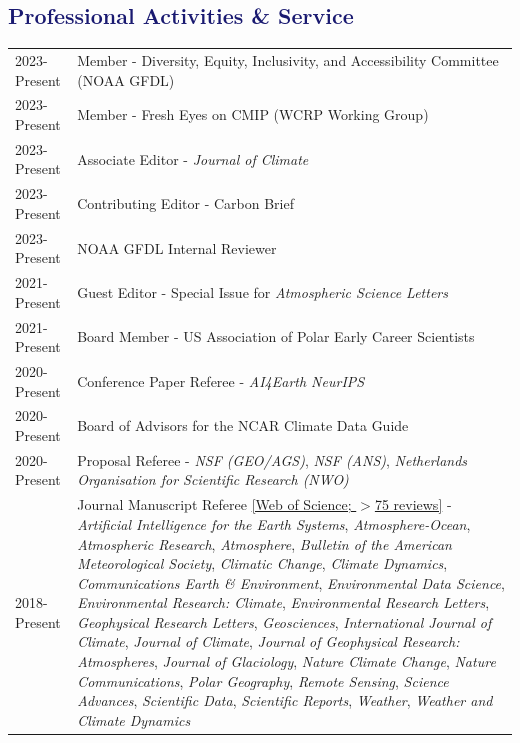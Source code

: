 \documentclass[margin,line,palatino,courier,10pt]{res}
\begin{document}
\begin{resume}
\section{\sc \textcolor{MidnightBlue}{\large{\textbf{Professional Activities \& Service}}}}
\vspace*{0.05in}
\begin{tabular}{@{}p{0.9in}p{4in}}
2023-Present & Member - Diversity, Equity, Inclusivity, and Accessibility Committee (NOAA GFDL)\\
2023-Present & Member - Fresh Eyes on CMIP (WCRP Working Group)\\
2023-Present & Associate Editor - \textit{Journal of Climate}\\
2023-Present & Contributing Editor - Carbon Brief\\
2023-Present & NOAA GFDL Internal Reviewer\\
2021-Present & Guest Editor - Special Issue for \textit{Atmospheric Science Letters}\\
2021-Present & Board Member - US Association of Polar Early Career Scientists\\
2020-Present & Conference Paper Referee - \textit{AI4Earth NeurIPS}\\
2020-Present & Board of Advisors for the NCAR Climate Data Guide\\
2020-Present & Proposal Referee - \textit{NSF (GEO/AGS)}, \textit{NSF (ANS)}, \textit{Netherlands Organisation for Scientific Research (NWO)}\\
2018-Present & Journal Manuscript Referee \href{https://www.webofscience.com/wos/author/record/J-4764-2019}{[Web of Science; $>$75 reviews]} - \textit{Artificial Intelligence for the Earth Systems}, \textit{Atmosphere-Ocean}, \textit{Atmospheric Research}, \textit{Atmosphere}, \textit{Bulletin of the American Meteorological Society}, \textit{Climatic Change}, \textit{Climate Dynamics}, \textit{Communications Earth \& Environment}, \textit{Environmental Data Science}, \textit{Environmental Research: Climate}, \textit{Environmental Research Letters}, \textit{Geophysical Research Letters}, \textit{Geosciences}, \textit{International Journal of Climate}, \textit{Journal of Climate}, \textit{Journal of Geophysical Research: Atmospheres}, \textit{Journal of Glaciology}, \textit{Nature Climate Change}, \textit{Nature Communications}, \textit{Polar Geography}, \textit{Remote Sensing}, \textit{Science Advances}, \textit{Scientific Data}, \textit{Scientific Reports}, \textit{Weather}, \textit{Weather and Climate Dynamics} \\

\end{tabular}
\end{resume}
\end{document}
